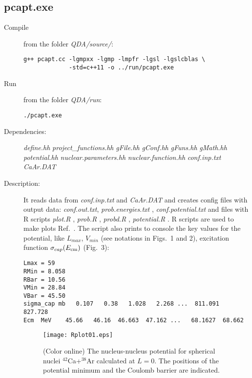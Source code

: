 \documentclass[preprint,review,12pt]{elsarticle}
\newcounter{bla}
\begin{document}
\subsection{pcapt.exe}
\label{sec:pcapt}

\begin{description}
       \item[Compile]  from the folder \textit{QDA/source/}:
\begin{verbatim}
g++ pcapt.cc -lgmpxx -lgmp -lmpfr -lgsl -lgslcblas \
             -std=c++11 -o ../run/pcapt.exe
\end{verbatim}
\item[Run] from the folder \textit{QDA/run}:
\begin{verbatim}
./pcapt.exe
\end{verbatim}

\item [Dependencies:]

\subitem \textit{define.hh}
\subitem \textit{project\_functions.hh}
\subitem \textit{gFile.hh}
\subitem \textit{gConf.hh}
\subitem \textit{gFuns.hh}
\subitem \textit{gMath.hh}
\subitem \textit{potential.hh}
\subitem \textit{nuclear.parameters.hh}
\subitem \textit{nuclear.function.hh}
\subitem \textit{conf.inp.txt }
\subitem \textit{CaAr.DAT }

\item [Description:]

   It reads data from \textit{conf.inp.txt} and \textit{CaAr.DAT} and creates config files with output data: \textit{conf.out.txt}, \textit{prob.energies.txt }, \textit{conf.potential.txt } and files with R scripts
   \textit{plot.R }, \textit{prob.R }, \textit{probd.R }, \textit{potential.R }. R scripts are used to make plots Ref.~\cite{Rscripts}.
The script also prints to console the key values for the potential, like $L_{max}$, $V_{min}$ (see notations in 
Figs.~1 and 2), excitation function $\sigma_{cap}(E_{\rm cm})$ (Fig.~3):

        \begin{verbatim}
Lmax = 59
RMin = 8.058
RBar = 10.56
VMin = 28.84
VBar = 45.50
sigma_cap mb   0.107   0.38   1.028   2.268 ...  811.091  827.728
Ecm  MeV    45.66   46.16  46.663  47.162 ...   68.1627  68.662
        \end{verbatim}



\begin{figure}[h!]
  \texttt{[image: Rplot01.eps]}
  \caption{(Color online) The nucleus-nucleus potential for spherical nuclei $^{42}$Ca+$^{38}$Ar calculated at
  $L=0$. The positions of the potential minimum and the Coulomb barrier are indicated.}
\end{figure}


\end{description}
\end{document}
